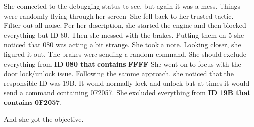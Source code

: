 She connected to the debugging status to see, but again it was a mess. Things were randomly flying through her screen. She fell back to her trusted tactic. Filter out all noise.
Per her description, she started the engine and then blocked everything but ID 80. Then she messed with the brakes. Putting them on 5 she noticed that 080 was acting a bit strange. She took a note.
Looking closer, she figured it out.
The brakes were sending a random command.
She should exclude everything from \textbf{ID 080 that contains FFFF}
She went on to focus with the door lock/unlock issue. Following the samme approach, she noticed that the responsible ID was 19B.
It would normally lock and unlock but at times it would send a command containing 0F2057.
She excluded everything from \textbf{ID 19B that contains 0F2057}.

And she got the objective.
